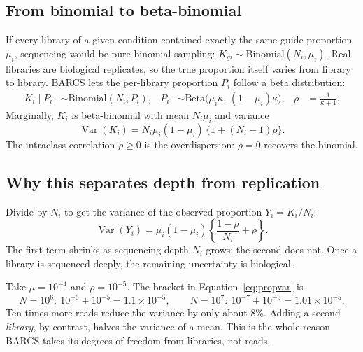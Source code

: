 \documentclass[11pt]{article}
\newcommand{\Var}{\operatorname{Var}}
\begin{document}
\subsection{From binomial to beta-binomial}

If every library of a given condition contained exactly the same guide
proportion $\mu_i$, sequencing would be pure binomial sampling:
$K_{gi}\sim\mathrm{Binomial}(N_i,\mu_i)$.  Real libraries are biological
replicates, so the true proportion itself varies from library to library.
BARCS lets the per-library proportion $P_i$ follow a beta distribution:
\begin{align}
K_i \mid P_i &\sim \mathrm{Binomial}(N_i, P_i), &
P_i &\sim \mathrm{Beta}\big(\mu_i\kappa,\,(1-\mu_i)\kappa\big), &
\rho &= \frac{1}{\kappa+1}.
\end{align}
Marginally, $K_i$ is beta-binomial with mean $N_i\mu_i$ and variance
\begin{equation}
\Var(K_i) = N_i\mu_i(1-\mu_i)\,\{1+(N_i-1)\rho\}.
\label{eq:var}
\end{equation}
The intraclass correlation $\rho\ge 0$ is the overdispersion: $\rho=0$
recovers the binomial.

\subsection{Why this separates depth from replication}

Divide by $N_i$ to get the variance of the observed proportion
$Y_i=K_i/N_i$:
\begin{equation}
\Var(Y_i)=\mu_i(1-\mu_i)\left\{\frac{1-\rho}{N_i}+\rho\right\}.
\label{eq:propvar}
\end{equation}
The first term shrinks as sequencing depth $N_i$ grows; the second does not.
Once a library is sequenced deeply, the remaining uncertainty is biological.

\begin{example}
Take $\mu=10^{-4}$ and $\rho=10^{-5}$.  The bracket in
Equation~\eqref{eq:propvar} is
\[
N=10^6:\ 10^{-6}+10^{-5}=1.1\times10^{-5},\qquad
N=10^7:\ 10^{-7}+10^{-5}=1.01\times10^{-5}.
\]
Ten times more reads reduce the variance by only about 8\%.  Adding a second
\emph{library}, by contrast, halves the variance of a mean.  This is the
whole reason BARCS takes its degrees of freedom from libraries, not reads.
\end{example}

\end{document}
